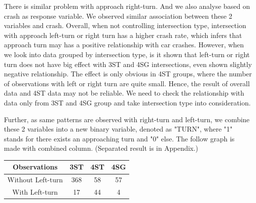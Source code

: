 \documentclass[11pt]{scrartcl} %
\begin{document}
There is similar problem with approach right-turn. And we also analyse based on crash as response variable. We observed similar association between these 2 variables and crash. Overall, when not controlling intersection type, intersection with approach left-turn or right turn has a higher crash rate, which infers that approach turn may has a positive relationship with car crashes. However, when we look into data grouped by intersection type, is it shown that left-turn or right turn does not have big effect with 3ST and 4SG intersections, even shown slightly negative relationship. The effect is only obvious in 4ST groups, where the number of observations with left or right turn are quite small. Hence, the result of overall data and 4ST data may not be reliable. We need to check the relationship with data only from 3ST and 4SG group and take intersection type into consideration.

Further, as same patterns are observed with right-turn and left-turn, we combine these 2 variables into a new binary variable, denoted as "TURN", where "1" stands for there exists an approaching turn and "0" else. The follow graph is made with combined column. (Separated result is in Appendix.)

\begin{table}[H]
\begin{tabular}{|c|c|c|c|}
\hline
Observations      & 3ST & 4ST & 4SG \\
\hline
Without Left-turn & 368 & 58  & 57  \\
\hline
With Left-turn    & 17  & 44  & 4   \\
\hline
\end{tabular}
\end{table}
\end{document}
